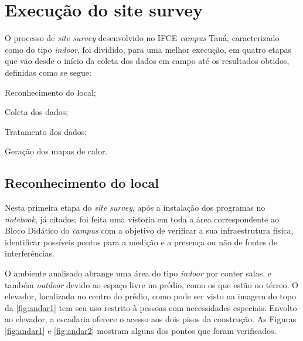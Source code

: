 \section{Execução do site survey}
\label{sec:execucao-site-survey}

O processo de \textit{site survey} desenvolvido no IFCE \textit{campus} Tauá, caracterizado como do tipo \textit{indoor}, foi dividido, para uma melhor execução, em quatro etapas que vão desde o início da coleta dos dados em campo até os resultados obtidos, definidas como se segue:

\begin{compactenum}
	\item Reconhecimento do local;
	\item Coleta dos dados;
	\item Tratamento dos dados;
	\item Geração dos mapas de calor.
\end{compactenum}

\subsection{Reconhecimento do local}
\label{subsec:reconhecimento-do-local}

Nesta primeira etapa do \textit{site survey}, após a instalação dos programas no \textit{notebook}, já citados, foi feita uma vistoria em toda a área correspondente ao Bloco Didático do \textit{campus} com a objetivo de verificar a sua infraestrutura física, identificar possíveis pontos para a medição e a presença ou não de fontes de interferências.

O ambiente analisado abrange uma área do tipo \textit{indoor} por conter salas, e também \textit{outdoor} devido ao espaço livre no prédio, como os que estão no térreo. O elevador, localizado no centro do prédio, como pode ser visto na imagem do topo da \autoref{fig:andar1} tem seu uso restrito à pessoas com necessidades especiais. Envolto ao elevador, a escadaria oferece o acesso aos dois pisos da construção. As Figuras \ref{fig:andar1} e \ref{fig:andar2} mostram alguns dos pontos que foram verificados.

\begin{figure}[H]
	\centering
\end{figure}

\begin{figure}[H]
	\centering
\end{figure}

